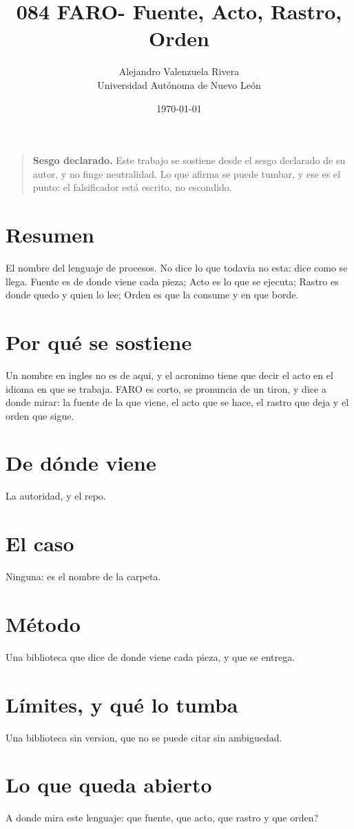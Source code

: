 \documentclass[11pt,a4paper]{article}
\title{084 FARO- Fuente, Acto, Rastro, Orden}
\author{Alejandro Valenzuela Rivera\\\small Universidad Autónoma de Nuevo León}
\date{\today}
\begin{document}
\maketitle

\begin{quote}
\textbf{Sesgo declarado.} Este trabajo se sostiene desde el sesgo declarado de su autor, y no finge neutralidad. Lo que afirma se puede tumbar, y ese es el punto: el falsificador está escrito, no escondido.
\end{quote}

\section*{Resumen}
El nombre del lenguaje de procesos. No dice lo que todavia no esta: dice como se llega. Fuente es de donde viene cada pieza; Acto es lo que se ejecuta; Rastro es donde quedo y quien lo lee; Orden es que la consume y en que borde.

\section{Por qué se sostiene}
Un nombre en ingles no es de aqui, y el acronimo tiene que decir el acto en el idioma en que se trabaja. FARO es corto, se pronuncia de un tiron, y dice a donde mirar: la fuente de la que viene, el acto que se hace, el rastro que deja y el orden que sigue.

\section{De dónde viene}
La autoridad, y el repo.

\section{El caso}
Ninguna: es el nombre de la carpeta.

\section{Método}
Una biblioteca que dice de donde viene cada pieza, y que se entrega.

\section{Límites, y qué lo tumba}
Una biblioteca sin version, que no se puede citar sin ambiguedad.

\section{Lo que queda abierto}
\textquestiondown{}A donde mira este lenguaje: que fuente, que acto, que rastro y que orden?
\end{document}
